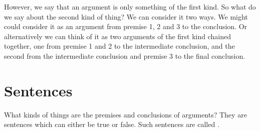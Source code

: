 However, we say that an argument is only something of the first kind. So what do we say about the second kind of thing? We can consider it two ways. We might could consider it as an argument from premise 1, 2 and 3 to the conclusion. Or alternatively we can think of it as two arguments of the first kind chained together, one from premise 1 and 2 to the intermediate conclusion, and the second from the intermediate conclusion and premise 3 to the final conclusion. 


%
%


\section{Sentences}
\label{intro.sentences}
What kinds of things are the premises and conclusions of arguments? They are sentences which can either be true or false. 
Such sentences are called . 

